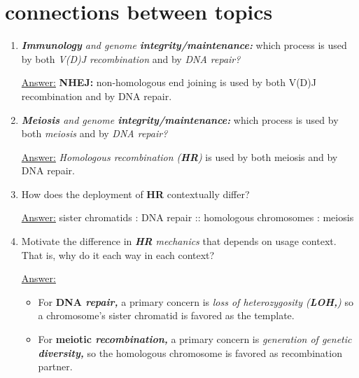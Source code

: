 \documentclass{article}
\newenvironment{QandA}{\begin{enumerate}[label=\bfseries Q\arabic*.]}
                       {\end{enumerate}}
\newenvironment{answered}{\par\normalfont\underline{Answer:}}{}
\begin{document}
\section{connections between topics}
\begin{QandA}
  \item{\textit{\textbf{Immunology} and genome \textbf{integrity/maintenance:}} which process is used by both \textit{V(D)J recombination} and by \textit{DNA repair?}}
    \begin{answered}
    \textbf{NHEJ:} non-homologous end joining is used by both V(D)J recombination and by DNA repair.
    \end{answered}
  \item{\textit{\textbf{Meiosis} and genome \textbf{integrity/maintenance:}} which process is used by both \textit{meiosis} and by \textit{DNA repair?}}
    \begin{answered}
    \textit{Homologous recombination (\textbf{HR})} is used by both meiosis and by DNA repair.
    \end{answered}
  \item{How does the deployment of \textbf{HR} contextually differ?}
    \begin{answered}
    sister chromatids : DNA repair :: homologous chromosomes : meiosis
    \end{answered}
  \item{Motivate the difference in \textit{\textbf{HR} mechanics} that depends on usage context. That is, why do it each way in each context?}
    \begin{answered}
    \begin{itemize}
      \item{For \textbf{DNA \textit{repair,}} a primary concern is \textit{loss of heterozygosity (\textbf{LOH,})} so a chromosome's sister chromatid is favored as the template.}
      \item{For \textbf{meiotic \textit{recombination,}} a primary concern is \textit{generation of genetic \textbf{diversity,}} so the homologous chromosome is favored as recombination partner.}
    \end{itemize}
    \end{answered}
\end{QandA}
\end{document}
